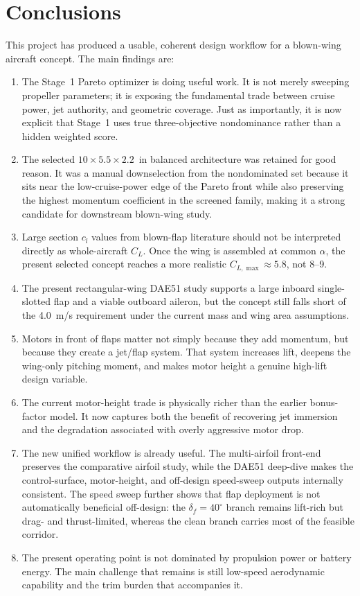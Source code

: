 \documentclass[conf]{new-aiaa}
\begin{document}
\section{Conclusions}

This project has produced a usable, coherent design workflow for a blown-wing aircraft concept. The main findings are:
\begin{enumerate}
\item The Stage~1 Pareto optimizer is doing useful work. It is not merely sweeping propeller parameters; it is exposing the fundamental trade between cruise power, jet authority, and geometric coverage. Just as importantly, it is now explicit that Stage~1 uses true three-objective nondominance rather than a hidden weighted score.
\item The selected \(10\times 5.5\times 2.2\)~in balanced architecture was retained for good reason. It was a manual downselection from the nondominated set because it sits near the low-cruise-power edge of the Pareto front while also preserving the highest momentum coefficient in the screened family, making it a strong candidate for downstream blown-wing study.
\item Large section \(c_l\) values from blown-flap literature should not be interpreted directly as whole-aircraft \(C_L\). Once the wing is assembled at common \(\alpha\), the present selected concept reaches a more realistic \(C_{L,\max}\approx 5.8\), not 8--9.
\item The present rectangular-wing DAE51 study supports a large inboard single-slotted flap and a viable outboard aileron, but the concept still falls short of the \SI{4.0}{m/s} requirement under the current mass and wing area assumptions.
\item Motors in front of flaps matter not simply because they add momentum, but because they create a jet/flap system. That system increases lift, deepens the wing-only pitching moment, and makes motor height a genuine high-lift design variable.
\item The current motor-height trade is physically richer than the earlier bonus-factor model. It now captures both the benefit of recovering jet immersion and the degradation associated with overly aggressive motor drop.
\item The new unified workflow is already useful. The multi-airfoil front-end preserves the comparative airfoil study, while the DAE51 deep-dive makes the control-surface, motor-height, and off-design speed-sweep outputs internally consistent. The speed sweep further shows that flap deployment is not automatically beneficial off-design: the \(\delta_f=40^\circ\) branch remains lift-rich but drag- and thrust-limited, whereas the clean branch carries most of the feasible corridor.
\item The present operating point is not dominated by propulsion power or battery energy. The main challenge that remains is still low-speed aerodynamic capability and the trim burden that accompanies it.
\end{enumerate}
\end{document}
